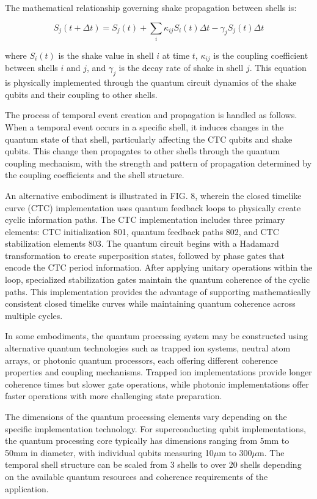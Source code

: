 \documentclass[12pt,letterpaper]{article}
\begin{document}
The mathematical relationship governing shake propagation between shells is:

$$S_j(t+\Delta t) = S_j(t) + \sum_i \kappa_{ij} S_i(t) \Delta t - \gamma_j S_j(t) \Delta t$$

where $S_i(t)$ is the shake value in shell $i$ at time $t$, $\kappa_{ij}$ is the coupling coefficient between shells $i$ and $j$, and $\gamma_j$ is the decay rate of shake in shell $j$. This equation is physically implemented through the quantum circuit dynamics of the shake qubits and their coupling to other shells.

The process of temporal event creation and propagation is handled as follows. When a temporal event occurs in a specific shell, it induces changes in the quantum state of that shell, particularly affecting the CTC qubits and shake qubits. This change then propagates to other shells through the quantum coupling mechanism, with the strength and pattern of propagation determined by the coupling coefficients and the shell structure.

An alternative embodiment is illustrated in FIG. 8, wherein the closed timelike curve (CTC) implementation uses quantum feedback loops to physically create cyclic information paths. The CTC implementation includes three primary elements: CTC initialization 801, quantum feedback paths 802, and CTC stabilization elements 803. The quantum circuit begins with a Hadamard transformation to create superposition states, followed by phase gates that encode the CTC period information. After applying unitary operations within the loop, specialized stabilization gates maintain the quantum coherence of the cyclic paths. This implementation provides the advantage of supporting mathematically consistent closed timelike curves while maintaining quantum coherence across multiple cycles.

In some embodiments, the quantum processing system may be constructed using alternative quantum technologies such as trapped ion systems, neutral atom arrays, or photonic quantum processors, each offering different coherence properties and coupling mechanisms. Trapped ion implementations provide longer coherence times but slower gate operations, while photonic implementations offer faster operations with more challenging state preparation.

The dimensions of the quantum processing elements vary depending on the specific implementation technology. For superconducting qubit implementations, the quantum processing core typically has dimensions ranging from 5mm to 50mm in diameter, with individual qubits measuring 10$\mu$m to 300$\mu$m. The temporal shell structure can be scaled from 3 shells to over 20 shells depending on the available quantum resources and coherence requirements of the application.
\end{document}
